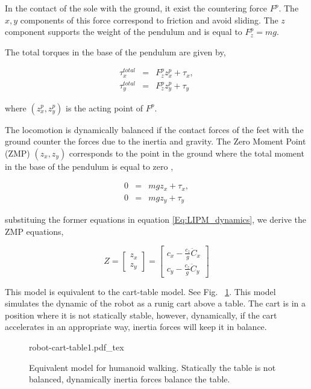 In the contact of the sole with the ground, it exist the countering force $F^p$. The $x,y$ components of this force correspond to friction and avoid sliding. The $z$ component supports the weight of the pendulum and is equal to $F^p_z = mg$.

The total torques in the base of the pendulum are given by,

\begin{eqnarray*}
\label{Eq:LIPM_total_torques}
\tau^{total}_{x} &=& F^p_z z^p_x + \tau_x, \\
\tau^{total}_{y} &=& F^p_z z^p_y + \tau_y
\end{eqnarray*}

where $(z^p_x, z^p_y)$ is the acting point of $F^p$.

The locomotion is dynamically balanced if the contact forces of the feet with the ground counter the forces due to the inertia and gravity. The Zero Moment Point (ZMP) $(z_x,z_y)$ corresponds to the point in the ground where the total moment in the base of the pendulum is equal to zero \citep{Vukobratovic1972,Vukobratovic2004},

\begin{eqnarray}
0 &=& m g z_x + \tau_x, \\
0 &=& m g z_y + \tau_y
\end{eqnarray}

substituing the former equations in equation \ref{Eq:LIPM_dynamics}, we derive the ZMP equations,

\begin{equation}
\label{Eq:LIPM_ZMP}
Z = 
\left[
\begin{matrix}
z_x \\ z_y
\end{matrix}
\right] = 
\left[
\begin{matrix}
c_x - \frac{c_z}{g}\ddot{C}_x \\ c_y - \frac{c_z}{g}\ddot{C}_y
\end{matrix}
\right]
\end{equation}

This model is equivalent to the cart-table model. See Fig. ~\ref{Fig:Inverted-Pendulum-Cart-Table}. This model simulates the dynamic of the robot as a runig cart above a table. The cart is in a position where it is not statically stable, however, dynamically, if the cart accelerates in an appropriate way, inertia forces will keep it in balance.

\begin{figure}
  \centering
      {\def\svgwidth{0.5\columnwidth}
        
                   {robot-cart-table1.pdf_tex}}
      \caption[]{Equivalent model for humanoid walking. Statically the table is not balanced, dynamically inertia forces balance the table.}
      \label{Fig:Inverted-Pendulum-Cart-Table}
\end{figure}

